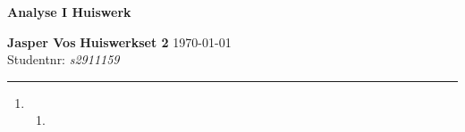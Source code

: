 \documentclass{article}
\begin{document}
{\Large \textbf{Analyse I Huiswerk}}

\bigskip

\textbf{Jasper Vos} \hfill \textbf{Huiswerkset 2} \hfill \today \\
Studentnr: \emph{s2911159} 

\rule{\textwidth}{2pt}

\bigskip

\begin{enumerate}
    \item
    \begin{enumerate}[label=\alph*)]
        \item 
        
    \end{enumerate}
\end{enumerate}
\end{document}
